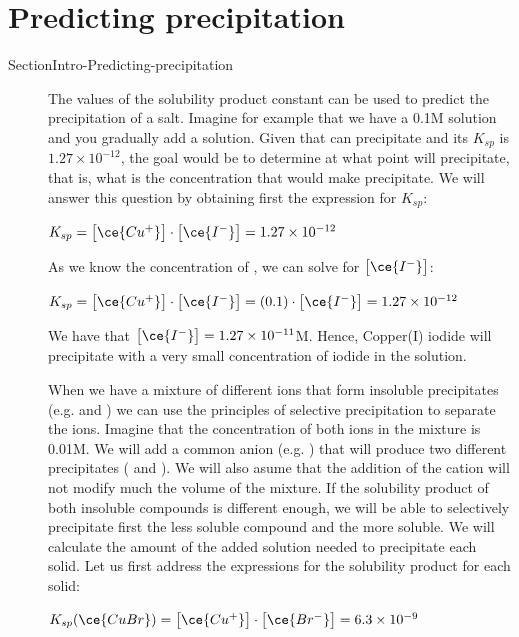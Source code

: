 \documentclass[main.tex]{subfiles}
\begin{document}
\section{Predicting precipitation } {SectionIntro-Predicting-precipitation}
\sloppy\begin{description}
\item[]
The values of the solubility product constant can be used to predict the precipitation of a salt. Imagine for example that we have a 0.1M  solution and you gradually add a  solution. Given that  can precipitate and its $K_{sp}$ is $1.27\times 10^{-12}$, the goal would be to determine at what point will  precipitate, that is, what is the  concentration that would make  precipitate. We will answer this question by obtaining first the expression for $K_{sp}$:
\begin{center}\hfill $K_{sp}= \big[ \ce{Cu^{+}} \big]\cdot \big[ \ce{I^{-}} \big]=1.27\times 10^{-12}$\end{center}
As we know the concentration of , we can solve for $\big[ \ce{I^{-}} \big]$:
\begin{center}$K_{sp}= \big[ \ce{Cu^{+}} \big]\cdot \big[ \ce{I^{-}} \big]=(0.1)\cdot\big[ \ce{I^{-}} \big]=1.27\times 10^{-12}$\end{center}
We have that $\big[ \ce{I^{-}} \big]=1.27\times 10^{-11}$M. Hence, Copper(I) iodide will precipitate with a very small concentration of iodide in the solution. 
\item[] When we have a mixture of different ions that form insoluble precipitates (e.g.  and ) we can use the principles of selective precipitation to separate the ions. Imagine that the concentration of both ions in the mixture is 0.01M. We will add a common anion (e.g. ) that will produce two different precipitates ( and ). We will also asume that the addition of the cation will not modify much the volume of the mixture. If the solubility product of both insoluble compounds is different enough, we will be able to selectively precipitate first the less soluble compound and the more soluble. We will calculate the amount of the added solution needed to precipitate each solid. Let us first address the expressions for the solubility product for each solid:
\begin{center}
\hfill $K_{sp}(\ce{CuBr})= \big[ \ce{Cu^{+}} \big]\cdot \big[ \ce{Br^{-}} \big]=6.3\times 10^{-9}$\\

\end{center}
\end{description}
\end{document}
